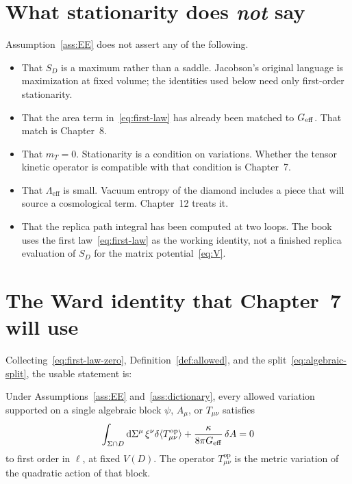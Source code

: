 \section{What stationarity does \emph{not} say}
\label{sec:ch6-does-not}

Assumption~\ref{ass:EE} does not assert any of the following.

\begin{itemize}
  \item That \(S_D\) is a maximum rather than a saddle. Jacobson's
        original language is maximization at fixed volume; the
        identities used below need only first-order stationarity.
  \item That the area term in~\eqref{eq:first-law} has already been
        matched to \(G_{\mathrm{eff}}\). That match is Chapter~8.
  \item That \(m_T=0\). Stationarity is a condition on variations.
        Whether the tensor kinetic operator is compatible with that
        condition is Chapter~7.
  \item That \(\Lambda_{\mathrm{eff}}\) is small. Vacuum entropy of
        the diamond includes a piece that will source a
        cosmological term. Chapter~12 treats it.
  \item That the replica path integral has been computed at two
        loops. The book uses the first law~\eqref{eq:first-law} as
        the working identity, not a finished replica evaluation of
        \(S_D\) for the matrix potential~\eqref{eq:V}.
\end{itemize}

\section{The Ward identity that Chapter~7 will use}
\label{sec:ch6-ward}

Collecting~\eqref{eq:first-law-zero}, Definition~\ref{def:allowed},
and the split~\eqref{eq:algebraic-split}, the usable statement is:

\begin{proposition}
  \label{prop:ward}
  Under Assumptions~\ref{ass:EE} and~\ref{ass:dictionary}, every
  allowed variation supported on a single algebraic block
  \(\psi\), \(A_\mu\), or \(T_{\mu\nu}\) satisfies
  \begin{equation}
    \label{eq:ward}
    \int_{\Sigma\cap D}
    \mathrm{d}\Sigma^\mu\,\xi^\nu
    \delta\langle T_{\mu\nu}^{\mathrm{op}}\rangle
    +\frac{\kappa}{8\pi G_{\mathrm{eff}}}\,\delta A
    =0
  \end{equation}
  to first order in \(\ell\), at fixed \(V(D)\). The operator
  \(T_{\mu\nu}^{\mathrm{op}}\) is the metric variation of the
  quadratic action of that block.
\end{proposition}

